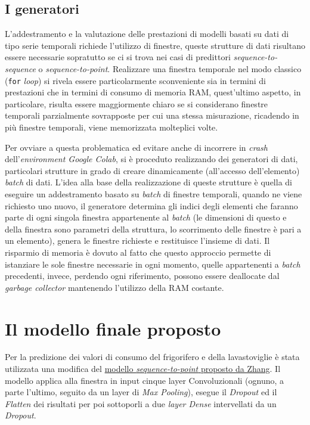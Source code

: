 \documentclass[12pt,a4paper,fleqn]{article}
\begin{document}
\subsection{I generatori}
L'addestramento e la valutazione delle prestazioni di modelli basati su dati di tipo serie temporali richiede l'utilizzo di finestre, queste strutture di dati risultano essere necessarie sopratutto se ci si trova nei casi di predittori \textsl{sequence-to-sequence} o \textsl{sequence-to-point}. Realizzare una finestra temporale nel modo classico (\texttt{for} \textit{loop}) si rivela essere particolarmente sconveniente sia in termini di prestazioni che in termini di consumo di memoria RAM, quest'ultimo aspetto, in particolare, risulta essere maggiormente chiaro se si considerano finestre temporali parzialmente sovrapposte per cui una stessa misurazione, ricadendo in più finestre temporali, viene memorizzata molteplici volte.

Per ovviare a questa problematica ed evitare anche di incorrere in \textsl{crash} dell'\textsl{environment Google Colab}, si è proceduto realizzando dei generatori di dati, particolari strutture in grado di creare dinamicamente (all'accesso dell'elemento) \textsl{batch} di dati. L'idea alla base della realizzazione di queste strutture è quella di eseguire un addestramento basato su \textsl{batch} di finestre temporali, quando ne viene richiesto uno nuovo, il generatore determina gli indici degli elementi che faranno parte di ogni singola finestra appartenente al \textsl{batch} (le dimensioni di questo e della finestra sono parametri della struttura, lo scorrimento delle finestre è pari a un elemento), genera le finestre richieste e restituisce l'insieme di dati. Il risparmio di memoria è dovuto al fatto che questo approccio permette di istanziare le sole finestre necessarie in ogni momento, quelle appartenenti a \textsl{batch} precedenti, invece, perdendo ogni riferimento, possono essere deallocate dal \textsl{garbage collector} mantenendo l'utilizzo della RAM costante.

\section{Il modello finale proposto}

Per la predizione dei valori di consumo del frigorifero e della lavastoviglie è stata utilizzata una modifica del \href{https://arxiv.org/abs/1612.09106}{modello \textsl{sequence-to-point} proposto da Zhang}.
Il modello applica alla finestra in input cinque layer Convoluzionali (ognuno, a parte l'ultimo, seguito da un layer di \textsl{Max Pooling}), esegue il \textsl{Dropout} ed il \textsl{Flatten} dei risultati per poi sottoporli a due \textsl{layer Dense} intervellati da un \textsl{Dropout}.
\end{document}
